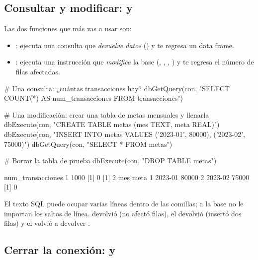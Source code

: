 \subsection{Consultar y modificar: \texorpdfstring{}{dbGetQuery()} y \texorpdfstring{}{dbExecute()}}

Las dos funciones que más vas a usar son:

\begin{itemize}
  \item {}: ejecuta una consulta que
        \emph{devuelve datos} () y te regresa un data frame.
  \item {}: ejecuta una instrucción que
        \emph{modifica} la base (, ,
        , ) y te regresa el número de filas
        afectadas.
\end{itemize}

\begin{rcode}
# Una consulta: ¿cuántas transacciones hay?
dbGetQuery(con, "SELECT COUNT(*) AS num_transacciones
                 FROM transacciones")

# Una modificación: crear una tabla de metas mensuales y llenarla
dbExecute(con, "CREATE TABLE metas (mes TEXT, meta REAL)")
dbExecute(con, "INSERT INTO metas VALUES ('2023-01', 80000),
                                         ('2023-02', 75000)")
dbGetQuery(con, "SELECT * FROM metas")

# Borrar la tabla de prueba
dbExecute(con, "DROP TABLE metas")
\end{rcode}

\begin{rsalida}
  num_transacciones
1              1000
[1] 0
[1] 2
      mes  meta
1 2023-01 80000
2 2023-02 75000
[1] 0
\end{rsalida}

El texto SQL puede ocupar varias líneas dentro de las comillas; a la base no
le importan los saltos de línea.  devolvió 
(no afectó filas), el  devolvió  (insertó dos filas)
y el  volvió a devolver .

\subsection{Cerrar la conexión: \texorpdfstring{}{dbDisconnect()} y \texorpdfstring{}{on.exit()}}

